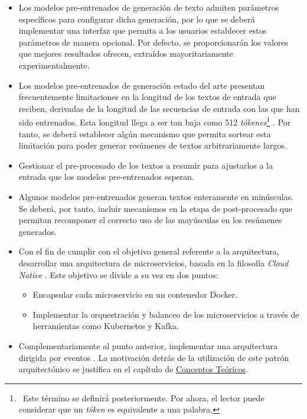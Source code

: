 \vspace{-0.2cm}
\begin{itemize} [\textbullet]
	\item Los modelos pre-entrenados de generación de texto admiten parámetros específicos para configurar dicha generación, por lo que se deberá implementar una interfaz que permita a los usuarios establecer estos parámetros de manera opcional. Por defecto, se proporcionarán los valores que mejores resultados ofrecen, extraídos mayoritariamente experimentalmente.
	
	\item Los modelos pre-entrenados de generación estado del arte presentan frecuentemente limitaciones en la longitud de los textos de entrada que reciben, derivadas de la longitud de las secuencias de entrada con las que han sido entrenados. Esta longitud llega a ser tan baja como 512 \emph{tókenes}\footnote{\, Este término se definirá posteriormente. Por ahora, el lector puede considerar que un \emph{tóken} es equivalente a una palabra.} \cite{raffel19}. Por tanto, se deberá establecer algún mecanismo que permita sortear esta limitación para poder generar resúmenes de textos arbitrariamente largos.

	\item Gestionar el pre-procesado de los textos a resumir para ajustarlos a la entrada que los modelos pre-entrenados esperan.

	\item Algunos modelos pre-entrenados generan textos enteramente en minúsculas. Se deberá, por tanto, incluir mecanismos en la etapa de post-procesado que permitan recomponer el correcto uso de las mayúsculas en los resúmenes generados.

	\item Con el fin de cumplir con el objetivo general referente a la arquitectura, desarrollar una arquitectura de microservicios, basada en la filosofía \emph{Cloud Native} \cite{cloud20, arundel19}. Este objetivo se divide a su vez en dos puntos:
	\begin{itemize} [◦]
		\item Encapsular cada microservicio en un contenedor Docker.
		\item Implementar la orquestración y balanceo de los microservicios a través de herramientas como Kubernetes y Kafka.
	\end{itemize}

	\item Complementariamente al punto anterior, implementar una arquitectura dirigida por eventos \cite{bellemare20}. La motivación detrás de la utilización de este patrón arquitectónico se justifica en el capítulo de \hyperref[chapter:conceptos]{Conceptos Teóricos}.
	

\end{itemize}

